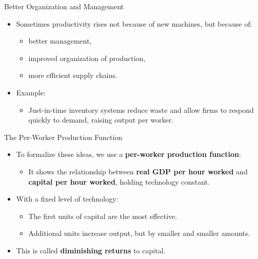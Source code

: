 \documentclass[aspectratio=169]{beamer}
\begin{document}
\begin{frame}{Better Organization and Management}
\transfade
\begin{itemize}[<+->]
  \item Sometimes productivity rises not because of new machines, but because of:
  \begin{itemize}[<+->]
    \item better management,
    \item improved organization of production,
    \item more efficient supply chains.
  \end{itemize}
  \item Example:
  \begin{itemize}[<+->]
    \item Just-in-time inventory systems reduce waste and allow firms to respond quickly to demand, raising output per worker.
  \end{itemize}
\end{itemize}
\end{frame}


\begin{frame}{The Per-Worker Production Function}
\transfade
\begin{itemize}[<+->]
  \item To formalize these ideas, we use a \textbf{per-worker production function}:
  \begin{itemize}[<+->]
    \item It shows the relationship between \textbf{real GDP per hour worked} and \textbf{capital per hour worked}, holding technology constant.
  \end{itemize}
  \item With a fixed level of technology:
  \begin{itemize}[<+->]
    \item The first units of capital are the most effective.
    \item Additional units increase output, but by \alert{smaller and smaller} amounts.
  \end{itemize}
  \item This is called \textbf{diminishing returns} to capital.
\end{itemize}
\end{frame}
\end{document}
